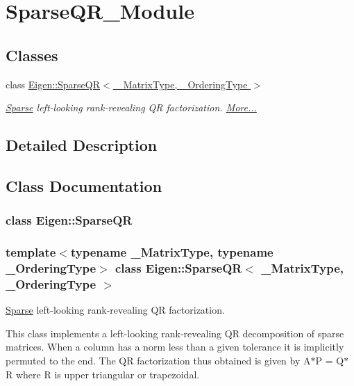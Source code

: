 \hypertarget{group___sparse_q_r___module}{}\section{Sparse\+Q\+R\+\_\+\+Module}
\label{group___sparse_q_r___module}
\subsection*{Classes}
\begin{DoxyCompactItemize}
\item 
class \hyperlink{group___sparse_q_r___module_class_eigen_1_1_sparse_q_r}{Eigen\+::\+Sparse\+Q\+R$<$ \+\_\+\+Matrix\+Type, \+\_\+\+Ordering\+Type $>$}
\begin{DoxyCompactList}\small\item\em \hyperlink{struct_eigen_1_1_sparse}{Sparse} left-\/looking rank-\/revealing QR factorization.  \hyperlink{group___sparse_q_r___module_class_eigen_1_1_sparse_q_r}{More...}\end{DoxyCompactList}\end{DoxyCompactItemize}


\subsection{Detailed Description}


\subsection{Class Documentation}
\label{class_eigen_1_1_sparse_q_r}
\subsubsection{class Eigen\+:\+:Sparse\+QR}
\subsubsection*{template$<$typename \+\_\+\+Matrix\+Type, typename \+\_\+\+Ordering\+Type$>$\newline
class Eigen\+::\+Sparse\+Q\+R$<$ \+\_\+\+Matrix\+Type, \+\_\+\+Ordering\+Type $>$}

\hyperlink{struct_eigen_1_1_sparse}{Sparse} left-\/looking rank-\/revealing QR factorization. 

This class implements a left-\/looking rank-\/revealing QR decomposition of sparse matrices. When a column has a norm less than a given tolerance it is implicitly permuted to the end. The QR factorization thus obtained is given by A$\ast$P = Q$\ast$R where R is upper triangular or trapezoidal.

